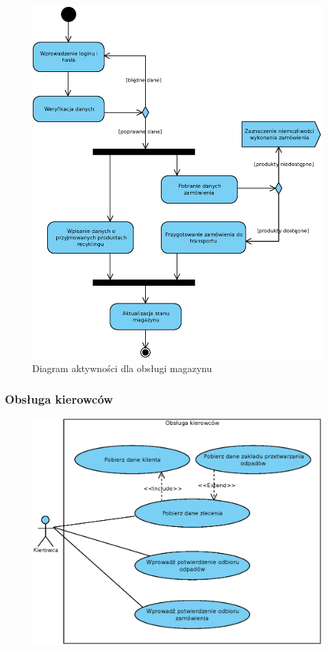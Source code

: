 	\begin{figure}[H]
		\centering
		\includegraphics[width=.9\textwidth]{img/AD/magazyn.eps}
		\caption{Diagram aktywności dla obsługi magazynu}
	\end{figure}

\subsubsection{Obsługa kierowców}

	\begin{figure}[H]
		\centering
		\includegraphics[width=.8\textwidth]{img/UC/kierowcy.eps}
	\end{figure}

